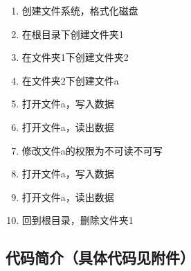 \documentclass{article}
\begin{document}
    \begin{enumerate}
        \item 创建文件系统，格式化磁盘
        \item 在根目录下创建文件夹1
        \item 在文件夹1下创建文件夹2
        \item 在文件夹2下创建文件a
        \item 打开文件a，写入数据
        \item 打开文件a，读出数据
        \item 修改文件a的权限为不可读不可写
        \item 打开文件a，写入数据
        \item 打开文件a，读出数据
        \item 回到根目录，删除文件夹1
    \end{enumerate}

    \subsection{代码简介（具体代码见附件）}
\end{document}
